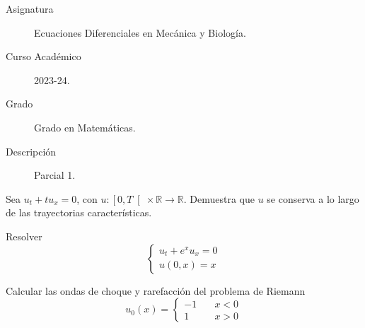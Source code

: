 \documentclass[12pt]{article}
\newcommand{\R}{\mathbb{R}}
\begin{document}

    
    

    \begin{description}
        \item[Asignatura] Ecuaciones Diferenciales en Mecánica y Biología.
        \item[Curso Académico] 2023-24.
        \item[Grado] Grado en Matemáticas.
        \item[Descripción] Parcial 1. 
    \end{description}
    \newpage



    \begin{ejercicio}
        Sea $u_t + t u_x = 0$, con $u : \left[0, T \right[ \times \R \to \R$. Demuestra que $u$ se conserva a lo largo de las trayectorias características.
    \end{ejercicio}

    \begin{ejercicio}
        Resolver 
        \begin{equation*}
            \begin{cases}
                u_t + e^x u_x = 0 \\
                u(0,x) = x
            \end{cases}
        \end{equation*}
    \end{ejercicio}

    \begin{ejercicio}
        Calcular las ondas de choque y rarefacción del problema de Riemann
        $$u_0(x) = \begin{cases}
            -1 \quad& x<0 \\
             1 \quad& x>0
        \end{cases}$$
    \end{ejercicio}
\end{document}
